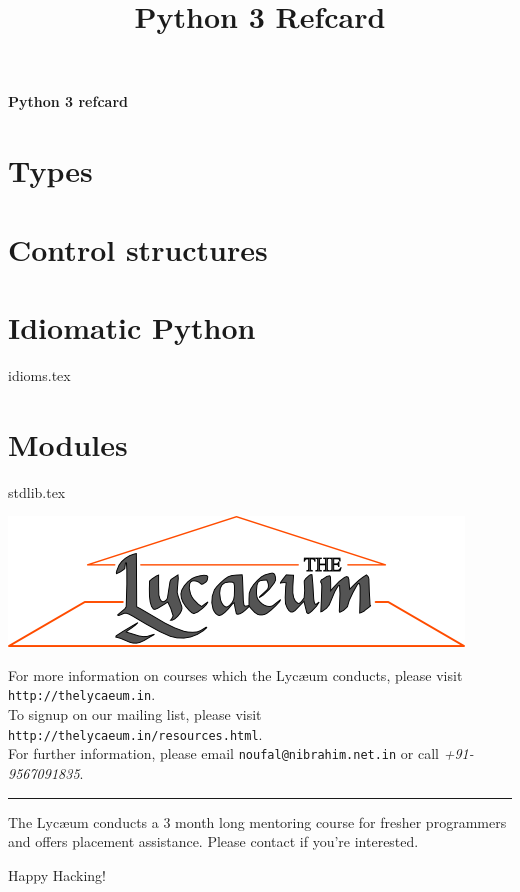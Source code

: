 \documentclass{refsheet}
\title{Python 3 Refcard}
\date{}
\author{}
\begin{document}
\begin{center}
\Large \textbf{Python 3 refcard}
\end{center}
\normalsize

\section{Types}







\section{Control structures}







\section{Idiomatic Python}
 {idioms.tex}

\section{Modules}
 {stdlib.tex}

\begin{center}
\includegraphics[scale=0.5]{images/parthenon-callig.png}
\end{center}
For more information on courses which the Lyc\ae{}um conducts, please
visit \texttt{http://thelycaeum.in}. \\To signup on our mailing list,
please visit \texttt{http://thelycaeum.in/resources.html}. \\For further
information, please email \texttt{noufal@nibrahim.net.in} or call
\textit{+91-9567091835}.
\noindent\rule[0.2ex]{\linewidth}{0.2ex}

The Lyc\ae{}um conducts a 3 month long mentoring course for fresher
programmers and offers placement assistance. Please contact if you're
interested.

\begin {center}
  \large Happy Hacking!
\end{center}
\end{document}
